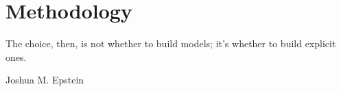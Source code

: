 \chapter{Methodology} \label{appendix-methodology}
\epigraph{The choice, then, is not whether to build models; it's whether to build explicit ones.}{Joshua M. Epstein \cite{epsteinWhyModel2008}}







